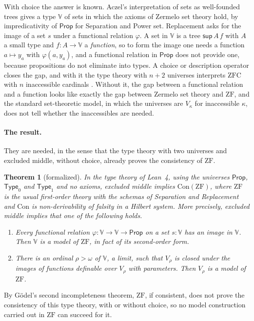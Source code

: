 \documentclass[10pt]{article}
\newtheorem{theorem}{Theorem}[section]
\theoremstyle{definition}
\theoremstyle{remark}
\newcommand{\Prop}{\mathsf{Prop}}
\newcommand{\Type}{\mathsf{Type}}
\newcommand{\ZF}{\mathrm{ZF}}
\newcommand{\ZFC}{\mathrm{ZFC}}
\newcommand{\Con}{\mathrm{Con}}
\newcommand{\V}{\mathbb{V}}
\begin{document}
With choice the answer is known. Aczel's interpretation of sets as
well-founded trees \cite{aczel78} gives a type $\V$ of sets in which
the axioms of Zermelo set theory hold, by impredicativity of $\Prop$ for
Separation and Power set. Replacement asks for the image of a set $s$
under a functional relation $\varphi$. A set in $\V$ is a tree
$\mathsf{sup}\,A\,f$ with $A$ a small type and $f:A\to\V$ a
\emph{function}, so to form the image one needs a function $a\mapsto y_a$
with $\varphi(a,y_a)$, and a functional relation in $\Prop$ does not
provide one, because propositions do not eliminate into types. A choice
or description operator closes the gap, and with it the type theory
with $n+2$ universes interprets $\ZFC$ with $n$ inaccessible cardinals
\cite{werner97,barras10,carneiro19}. Without it, the gap between a
functional relation and a function looks like exactly the gap between
Zermelo set theory and $\ZF$, and the standard set-theoretic model, in
which the universes are $V_\kappa$ for inaccessible $\kappa$, does not tell
whether the inaccessibles are needed.

\paragraph{The result.}
They are needed, in the sense that the type theory with two universes
and excluded middle, without choice, already proves the consistency of
$\ZF$.

\begin{theorem}[formalized]\label{thm:main}
In the type theory of Lean~4, using the universes $\Prop$, $\Type_0$ and
$\Type_1$ and no axioms, excluded middle implies $\Con(\ZF)$, where $\ZF$
is the usual first-order theory with the schemas of Separation and
Replacement and $\Con$ is non-derivability of falsity in a Hilbert
system. More precisely, excluded middle implies that one of the
following holds.
\begin{enumerate}
\item Every functional relation $\varphi:\V\to\V\to\Prop$ on a set $s:\V$ has
  an image in $\V$. Then $\V$ is a model of $\ZF$, in fact of its
  second-order form.
\item There is an ordinal $\rho>\omega$ of $\V$, a limit, such that $V_\rho$ is
  closed under the images of functions definable over $V_\rho$ with
  parameters. Then $V_\rho$ is a model of $\ZF$.
\end{enumerate}
\end{theorem}

By G\"odel's second incompleteness theorem, $\ZF$, if consistent, does
not prove the consistency of this type theory, with or without choice,
so no model construction carried out in $\ZF$ can succeed for it.
\end{document}
